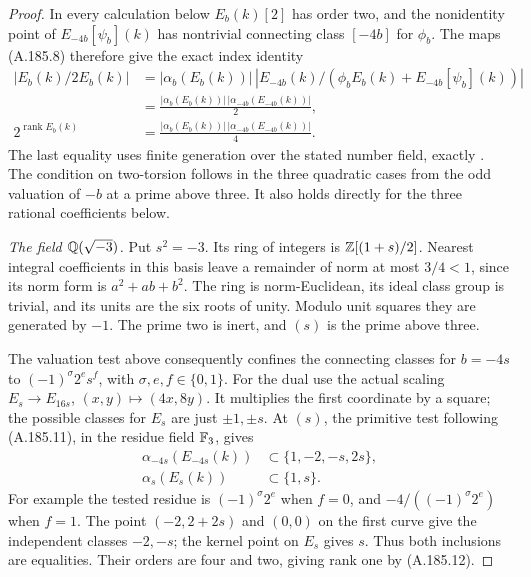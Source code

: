 \begin{proof}
In every calculation below \(E_b(k)[2]\) has order two, and
the nonidentity point of \(E_{-4b}[\psi_b](k)\) has nontrivial
connecting class \([-4b]\) for \(\phi_b\).  The maps (A.185.8)
therefore give the exact index identity
\[
\begin{aligned}
 |E_b(k)/2E_b(k)|
 &=|\alpha_b(E_b(k))|\,
   |E_{-4b}(k)/(\phi_bE_b(k)+E_{-4b}[\psi_b](k))|\\
 &=\frac{|\alpha_b(E_b(k))|\,
              |\alpha_{-4b}(E_{-4b}(k))|}{2},\\
 2^{\operatorname{rank}E_b(k)}
 &=\frac{|\alpha_b(E_b(k))|\,
              |\alpha_{-4b}(E_{-4b}(k))|}{4}.
\end{aligned}
\tag{A.185.12}
\]
The last equality uses finite generation over the stated number
field, exactly \cite[I, Theorem 16.7, p.69]{LegMilneAV2008}.
The condition on two-torsion follows in the three quadratic cases
from the odd valuation of \(-b\) at a prime above three.  It
also holds directly for the three rational coefficients below.

\emph{The field \(\mathbb Q(\sqrt{-3})\).}
Put \(s^2=-3\).  Its ring of integers is
\(\mathbb Z[(1+s)/2]\).  Nearest integral coefficients in this basis
leave a remainder of norm at most \(3/4<1\), since its norm
form is \(a^2+ab+b^2\).  The ring is norm-Euclidean, its ideal
class group is trivial, and its units are the six roots of unity.
Modulo unit squares they are generated by \(-1\).  The prime
two is inert, and \((s)\) is the prime above three.

The valuation test above consequently confines the connecting
classes for \(b=-4s\) to
\((-1)^\sigma2^es^f\), with \(\sigma,e,f\in\{0,1\}\).
For the dual use the actual scaling
\(E_s\longrightarrow E_{16s}\), \((x,y)\mapsto(4x,8y)\).
It multiplies the first coordinate by a square; the possible
classes for \(E_s\) are just \(\pm1,\pm s\).
At \((s)\), the primitive test following (A.185.11), in the
residue field \(\mathbb F_3\), gives
\[
\begin{aligned}
 \alpha_{-4s}(E_{-4s}(k))&\subset\{1,-2,-s,2s\},\\
 \alpha_s(E_s(k))&\subset\{1,s\}.
\end{aligned}
\tag{A.185.13}
\]
For example the tested residue is \((-1)^\sigma2^e\) when
\(f=0\), and \(-4/((-1)^\sigma2^e)\) when \(f=1\).
The point \((-2,2+2s)\) and \((0,0)\) on the first curve
give the independent classes \(-2,-s\); the kernel point on
\(E_s\) gives \(s\).  Thus both inclusions are equalities.
Their orders are four and two, giving rank one by (A.185.12).


\end{proof}
